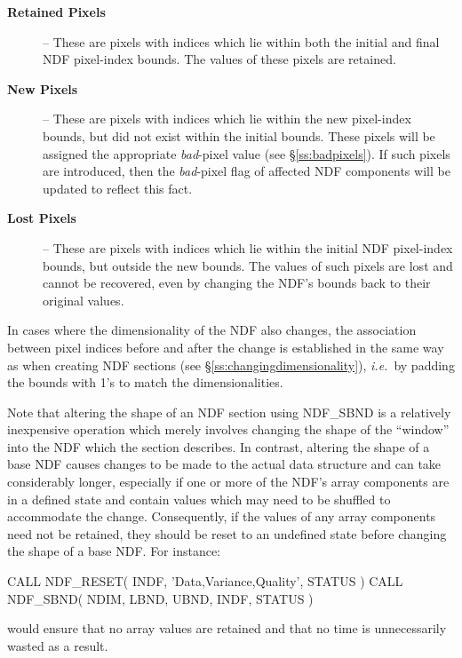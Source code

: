 \documentclass[twoside,11pt,nolof]{starlink}
\providecommand{\st}[1]{{\emph{#1}}}
\begin{document}
\begin{description}

\item[\textbf{Retained Pixels}] -- These are pixels with indices which lie
within both the initial and final NDF pixel-index bounds.
The values of these pixels are retained.

\item[\textbf{New Pixels}] -- These are pixels with indices which lie within
the new pixel-index bounds, but did not exist within the initial bounds.
These pixels will be assigned the appropriate \st{bad\/}-pixel value (see
\S\ref{ss:badpixels}).
If such pixels are introduced, then the \st{bad\/}-pixel flag of affected NDF
components will be updated to reflect this fact.

\item[\textbf{Lost Pixels}] -- These are pixels with indices which lie within
the initial NDF pixel-index bounds, but outside the new bounds.
The values of such pixels are lost and cannot be recovered, even by changing
the NDF's bounds back to their original values.

\end{description}

In cases where the dimensionality of the NDF also changes, the association
between pixel indices before and after the change is established in the same
way as when creating NDF sections (see \S\ref{ss:changingdimensionality}),
\st{i.e.}\ by padding the bounds with 1's to match the dimensionalities.

Note that altering the shape of an NDF section using NDF\_SBND is a
relatively inexpensive operation which merely involves changing the shape of
the ``window'' into the NDF which the section describes.
In contrast, altering the shape of a base NDF causes changes to be made to
the actual data structure and can take considerably longer, especially if one
or more of the NDF's array components are in a defined state and contain
values which may need to be shuffled to accommodate the change.
Consequently, if the values of any array components need not be retained,
they should be reset to an undefined state before changing the shape of a
base NDF.
For instance:

\small
\begin{terminalv}
      CALL NDF_RESET( INDF, 'Data,Variance,Quality', STATUS )
      CALL NDF_SBND( NDIM, LBND, UBND, INDF, STATUS )
\end{terminalv}
\normalsize

would ensure that no array values are retained and that no time is
unnecessarily wasted as a result.
\end{document}

